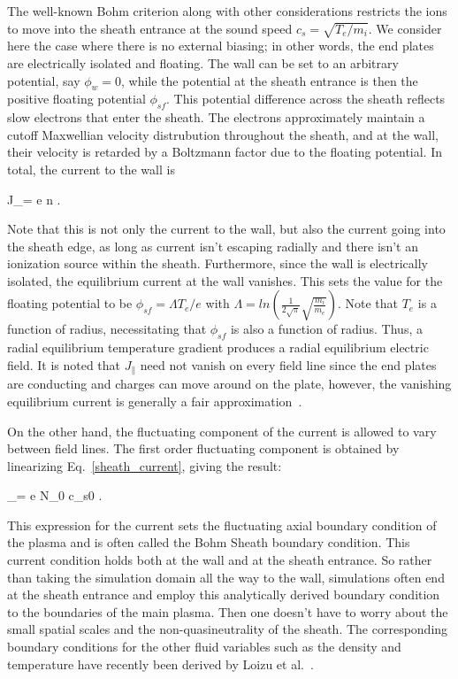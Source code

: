 The well-known Bohm criterion along with other considerations restricts the ions to move into the sheath entrance at the sound speed $c_s = \sqrt{T_e/m_i}$. 
We consider here the case where there is no external biasing; in other words, the end plates are electrically isolated and floating.
The wall can be set to an arbitrary potential, say $\phi_w = 0$, while the potential at the sheath entrance is then the positive 
floating potential $\phi_{sf}$. This potential difference across the sheath reflects slow electrons that enter the sheath.
The electrons approximately maintain a cutoff Maxwellian velocity distrubution throughout the sheath, and at the wall, 
their velocity is retarded by a Boltzmann factor due to the floating potential. 
In total, the current to the wall is~\cite{berk1993}

\beq
\label{sheath_current}
J_\parallel = e n .
\eeq

Note that this is not only the current to the wall, but also the current going into the sheath edge, as long as current isn't escaping radially and there isn't an ionization source
within the sheath.
Furthermore, since the wall is electrically isolated, the equilibrium current at the wall vanishes.
This sets the value for the floating potential to be $\phi_{sf} = \Lambda T_e / e$ with $\Lambda = ln(\frac{1}{2 \sqrt{\pi}} \sqrt{\frac{m_i}{m_e}})$.
Note that $T_e$ is a function of radius, necessitating that $\phi_{sf}$ is also a function of radius. Thus, a radial equilibrium temperature gradient produces a radial
equilibrium electric field. It is noted that $J_\parallel$ need not vanish on every field line since the end plates are conducting and charges can move around on the plate, 
however, the vanishing equilibrium current is generally a fair approximation~\cite{berk1993}.

On the other hand, the fluctuating component of the current is allowed to vary between field lines.
The first order fluctuating component is obtained by linearizing Eq.~\ref{sheath_current}, giving the result:

\beq
\label{lin_sheath_current}
_\parallel = e N_0 c_{s0} .
\eeq

This expression for the current sets the fluctuating axial boundary condition of the plasma and is often called the Bohm Sheath boundary condition. This current condition holds both at
the wall and at the sheath entrance. So rather than taking the simulation
domain all the way to the wall, simulations often end at the sheath entrance and employ this analytically derived boundary condition to the boundaries of the main plasma. 
Then one doesn't have to worry about the small spatial scales and the non-quasineutrality of the sheath.
The corresponding boundary conditions for the other fluid variables such as the density and temperature have recently been derived by Loizu et al.~\cite{loizu2012}.

